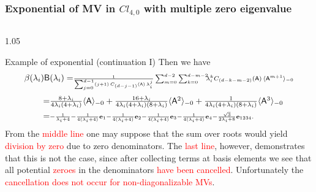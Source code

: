 \documentclass[xcolor=table,hyperref={pdfpagemode=FullScreen}]{beamer}
\newcommand{\cl}[2]{\ensuremath{\mathit{Cl}_{#1,#2}}} %
\newcommand{\e}[1]{\mathbf{e}_{#1}} %
\def\m#1{\mathsf{#1}} %
\def\m#1{\mathsf{#1}}%
\newcommand{\red}[1]{\textcolor{red}{#1}}
\begin{document}
\begin{frame}
\frametitle<presentation>{Exponential of MV in \cl{4}{0} with multiple zero eigenvalue}
\vskip -10pt
\begin{columns}[t]
\begin{column}{1.05\textwidth}
  \begin{block}{Example of exponential (continuation I)}
 Then we have
\begin{equation*}\label{example3Bi}
\begin{split}
  \beta(\lambda_i)\m{B}&(\lambda_i)= \scriptstyle\frac{1}{\sum_{j=0}^{d-1}(j+1)\,C_{(d -j-1)}(\m{A})\, \lambda_i^{j}}
  \sum_{m=0}^{d-2} \sum_{k=0}^{d-m-2}\!\!\!\lambda_i^k C_{(d-k-m-2)}(\m{A})\, \langle\m{A}^{m+1}\rangle_{-0}\\[3pt]
  =&\textstyle
 \frac{8+\lambda_i}{4 \lambda_i (4+\lambda_i)}\langle\m{A}\rangle_{-0}+ \frac{16+\lambda_i}{4 \lambda_i (4+\lambda_i) (8+\lambda_i) }\langle\m{A}^{2}\rangle_{-0}+\frac{1}{4 \lambda_i (4+\lambda_i) (8+\lambda_i) }\langle\m{A}^{3}\rangle_{-0}
  \\
  =&\scriptstyle -\frac{1}{\lambda_i +4}-\frac{1}{4 (\lambda_i +4)}\e{1}-\frac{1}{4 (\lambda_i +4)}\e{2}-\frac{1}{4 (\lambda_i +4)}\e{3}-\frac{1}{4 (\lambda_i +4)}\e{4}-\frac{\sqrt{3}}{2 \lambda_i +8}\e{1234}\/.
\end{split}
\end{equation*}
    From the \red{middle line} one may suppose that the sum over
    roots would yield \red{division by zero} due to zero denominators. The
    \red{last line}, however, demonstrates that this is not the case, since
after collecting terms at basis elements we see that all potential
    \red{zeroes} in the denominators \red{have been cancelled}. Unfortunately the
    \red{cancellation does not occur for non-diagonalizable MVs}.
 \end{block}
\end{column}
\end{columns}
\end{frame}
\end{document}

